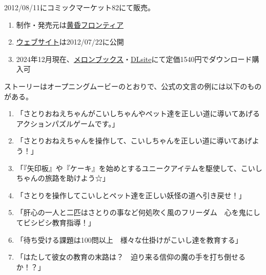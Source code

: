 

%




2012/08/11にコミックマーケット82にて販売。
\begin{enumerate}[label={\sarrow}]
\item 制作・発売元は\href{http://tasofro.net/}{黄昏フロンティア}
\item \href{http://tasofro.net/satori/}{ウェブサイト}は2012/07/22に公開
\item 2024年12月現在、\href{https://www.melonbooks.co.jp/detail/detail.php?product_id=967172}{メロンブックス}・\href{https://www.dlsite.com/home/work/=/product_id/RJ144848.html}{DLsite}にて定価1540円でダウンロード購入可
\end{enumerate}



ストーリーはオープニングムービーのとおりで、公式の文言の例には以下のものがある。
\begin{enumerate}[label={\sarrow}]
\item 「さとりおねえちゃんがこいしちゃんやペット達を正しい道に導いてあげるアクションパズルゲームです。」
\item 「さとりおねえちゃんを操作して、こいしちゃんを正しい道に導いてあげよう！」
\item 「『矢印板』や『ケーキ』を始めとするユニークアイテムを駆使して、こいしちゃんの旅路を助けよう☆」
\item 「さとりを操作してこいしとペット達を正しい妖怪の道へ引き戻せ！」
\item 「肝心の一人と二匹はさとりの事など何処吹く風のフリーダム　心を鬼にしてビシビシ教育指導！」
\item 「待ち受ける課題は100問以上　様々な仕掛けがこいし達を教育する」
\item 「はたして彼女の教育の末路は？　迫り来る信仰の魔の手を打ち倒せるか！？」
\end{enumerate}



